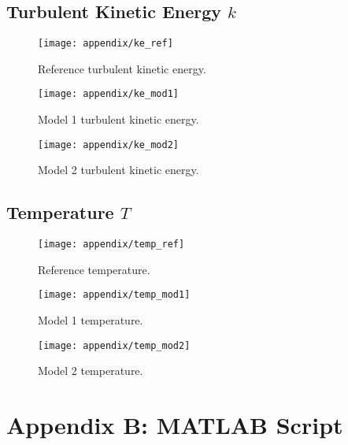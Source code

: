 \section{Turbulent Kinetic Energy $k$}
\begin{figure}[H]
    	\centering
        \texttt{[image: appendix/ke\_ref]}
        \caption{Reference turbulent kinetic energy.}
        \label{fig:ke_ref}
\end{figure}
\begin{figure}[H]
    	\centering
        \texttt{[image: appendix/ke\_mod1]}
        \caption{Model 1 turbulent kinetic energy.}
        \label{fig:ke_mod1}
\end{figure}
\begin{figure}[H]
    	\centering
        \texttt{[image: appendix/ke\_mod2]}
        \caption{Model 2 turbulent kinetic energy.}
        \label{fig:ke_mod2}
\end{figure}

\section{Temperature $T$}
\begin{figure}[H]
    	\centering
        \texttt{[image: appendix/temp\_ref]}
        \caption{Reference temperature.}
        \label{fig:temp_ref}
\end{figure}
\begin{figure}[H]
    	\centering
        \texttt{[image: appendix/temp\_mod1]}
        \caption{Model 1 temperature.}
        \label{fig:temp_mod1}
\end{figure}
\begin{figure}[H]
    	\centering
        \texttt{[image: appendix/temp\_mod2]}
        \caption{Model 2 temperature.}
        \label{fig:temp_mod2}
\end{figure}


\chapter{Appendix B: MATLAB Script}
\label{appendix:matlab}
\hypertarget{appendixb}{}
\nopagebreak
\begin{scriptsize}
	
\end{scriptsize}
